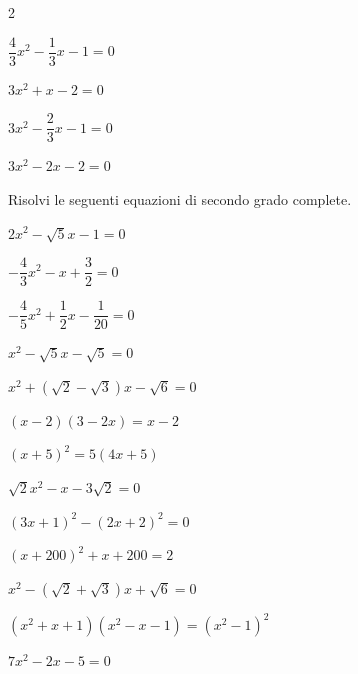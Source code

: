 \begin{esercizio}[*]
\begin{htmulticols}{2}
\begin{enumeratea}
\item \(\dfrac{4}{3} x^{2}-\dfrac{1}{3} x-1 = 0\)
\item \(3 x^{2} + x-2 = 0\)
\item \(3 x^{2}-\dfrac{2}{3} x-1 = 0\)
\item \(3 x^{2}-2 x-2 = 0\)
\end{enumeratea}
\end{htmulticols}
\end{esercizio}


\begin{esercizio}[*]
\label{ese:3.17}
Risolvi le seguenti equazioni di secondo grado complete.
\begin{enumeratea}
\item \(2 x^{2}-\sqrt{5} x-1=0\)
\item \(- \dfrac{4}{3} x^{2}-x + \dfrac{3}{2}=0\)
\item \(- \dfrac{4}{5} x^{2} + \dfrac{1}{2} x-\dfrac{1}{20}=0\)
\item \(x^{2}-\sqrt{5} x-\sqrt{5}=0\)
\item \(x^{2} + (\sqrt{2}-\sqrt{3}) x-\sqrt{6} = 0\)
\item \((x-2) (3-2 x) = x-2\)
\item \((x + 5)^{2} = 5 (4 x + 5)\)
\item \(\sqrt{2} x^{2}-x-3 \sqrt{2} = 0\)
\item \((3 x + 1)^{2}-(2 x + 2)^{2} = 0\)
\item \((x + 200)^{2} + x + 200 = 2\)
\item \(x^{2}-(\sqrt{2} + \sqrt{3}) x + \sqrt{6} = 0\)
\item \((x^{2} + x + 1) (x^{2}-x-1) = (x^{2}-1)^{2}\)
\item \(7 x^{2}-2 x-5 = 0\)
\end{enumeratea}
\end{esercizio}

